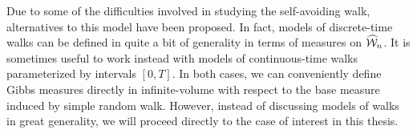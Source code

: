 Due to some of the difficulties involved in studying the self-avoiding walk,
alternatives to this model have been proposed. In fact, models of discrete-time
walks can be defined in quite a bit of generality in terms of measures on $\widehat{\mathcal{W}}_n$.
It is sometimes useful to work instead with models of continuous-time walks
parameterized by intervals $[0, T]$. In both cases, we can conveniently define
Gibbs measures directly in infinite-volume with respect to the base measure induced
by simple random walk. However, instead of discussing models of walks in great
generality, we will proceed directly to the case of interest in this thesis.




